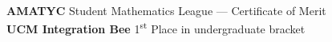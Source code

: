 \documentclass[./Resume.tex]{subfiles}
\begin{document}
	\\{\bfseries AMATYC} Student Mathematics League --- Certificate of Merit\\
	{\bfseries UCM Integration Bee} 1\textsuperscript{st} Place in undergraduate bracket
	\vspace*{-2mm}
\end{document}
